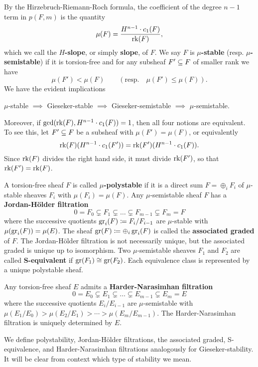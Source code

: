 By the Hirzebruch-Riemann-Roch formula, the coefficient of the degree $n-1$ term in $p(F, m)$ is the quantity
\[ \mu(F) = \frac{H^{n-1} \cdot c_1(F)}{\operatorname{\mathrm{rk}}(F)}, \]
which we call the \textbf{$H$-slope}, or simply \textbf{slope}, of $F$. We say $F$ is \textbf{$\mu$-stable} (resp. \textbf{$\mu$-semistable}) if it is torsion-free and for any subsheaf $F' \subseteq F$ of smaller rank we have 
\[ \mu(F') < \mu(F) \qquad (\text{resp.} \quad \mu(F') \le \mu(F)). \]
We have the evident implications
\begin{center}
    $\mu$-stable $\implies$ Gieseker-stable $\implies$ Gieseker-semistable $\implies$ $\mu$-semistable.
\end{center}
Moreover, if $\gcd(\operatorname{\mathrm{rk}}(F), H^{n-1}\cdot c_1(F)) = 1$, then all four notions are equivalent. To see this, let $F' \subseteq F$ be a subsheaf with $\mu(F') = \mu(F)$, or equivalently
\[ \operatorname{\mathrm{rk}}(F) (H^{n-1} \cdot c_1(F')) = \operatorname{\mathrm{rk}}(F') (H^{n-1}\cdot c_1(F)). \]
Since $\operatorname{\mathrm{rk}}(F)$ divides the right hand side, it must divide $\operatorname{\mathrm{rk}}(F')$, so that $\operatorname{\mathrm{rk}}(F') = \operatorname{\mathrm{rk}}(F)$. 

A torsion-free sheaf $F$ is called \textbf{$\mu$-polystable} if it is a direct sum $F = \oplus_i F_i$ of $\mu$-stable sheaves $F_i$ with $\mu(F_i) = \mu(F)$. Any $\mu$-semistable sheaf $F$ has a \textbf{Jordan-H\"older filtration}
\[ 0 = F_0 \subsetneq F_1 \subsetneq \ldots \subsetneq F_{m-1} \subsetneq F_m = F \]
where the successive quotients $\operatorname{\mathrm{gr}}_i(F) \coloneqq F_i/F_{i-1}$ are $\mu$-stable with $\mu(\operatorname{\mathrm{gr}}_i(F)) = \mu(E)$. The sheaf $\operatorname{\mathrm{gr}}(F) \coloneqq \oplus_i \operatorname{\mathrm{gr}}_i(F)$ is called the \textbf{associated graded} of $F$. The Jordan-H\"older filtration is not necessarily unique, but the associated graded is unique up to isomorphism. Two $\mu$-semistable sheaves $F_1$ and $F_2$ are called \textbf{S-equivalent} if $\operatorname{\mathrm{gr}}(F_1) \cong \operatorname{\mathrm{gr}}(F_2)$. Each equivalence class is represented by a unique polystable sheaf.

Any torsion-free sheaf $E$ admits a \textbf{Harder-Narasimhan filtration}
\[ 0 = E_0 \subsetneq E_1 \subsetneq \ldots \subsetneq E_{m-1} \subsetneq E_m = E \]
where the successive quotients $E_i/E_{i-1}$ are $\mu$-semistable with $\mu(E_1/E_0) > \mu(E_2/E_1) > \cdots > \mu(E_m/E_{m-1})$. The Harder-Narasimhan filtration is uniquely determined by $E$.

We define polystability, Jordan-H\"older filtrations, the associated graded, S-equivalence, and Harder-Narasimhan filtrations analogously for Gieseker-stability. It will be clear from context which type of stability we mean.

